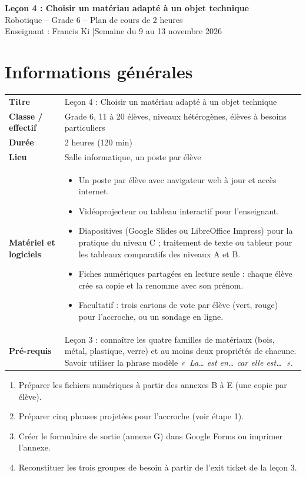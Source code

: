 \documentclass[11pt,a4paper]{article}
\begin{document}
\begin{tcolorbox}[colback=teal!10,colframe=teal!70!black,arc=2mm,boxrule=1pt]
\centering
{\LARGE\bfseries Leçon 4 : Choisir un matériau adapté à un objet technique}\\[2mm]
{\large Robotique -- Grade 6 -- Plan de cours de 2 heures}\\[1mm]
Enseignant : Francis Ki \quad|\quad Semaine du 9 au 13 novembre 2026
\end{tcolorbox}

\section{Informations générales}
\begin{tabularx}{\linewidth}{>{\bfseries}p{3.6cm}Y}
\toprule
Titre & Leçon 4 : Choisir un matériau adapté à un objet technique\\
Classe / effectif & Grade 6, 11 à 20 élèves, niveaux hétérogènes, élèves à besoins particuliers\\
Durée & 2 heures (120 min)\\
Lieu & Salle informatique, un poste par élève\\
Matériel et logiciels &
\begin{itemize}
 \item Un poste par élève avec navigateur web à jour et accès internet.
 \item Vidéoprojecteur ou tableau interactif pour l'enseignant.
 \item Diapositives (Google Slides ou LibreOffice Impress) pour la pratique du niveau C ; traitement de texte ou tableur pour les tableaux comparatifs des niveaux A et B.
 \item Fiches numériques partagées en lecture seule : chaque élève crée sa copie et la renomme avec son prénom.
 \item Facultatif : trois cartons de vote par élève (vert, rouge) pour l'accroche, ou un sondage en ligne.
\end{itemize}\\
Pré-requis &
Leçon 3 : connaître les quatre familles de matériaux (bois, métal, plastique, verre) et au moins deux propriétés de chacune. Savoir utiliser la phrase modèle \textit{«~La\ldots{} est en\ldots{} car elle est\ldots~»}.\\
\bottomrule
\end{tabularx}

\begin{astuce}
\begin{enumerate}
 \item Préparer les fichiers numériques à partir des annexes B à E (une copie par élève).
 \item Préparer cinq phrases projetées pour l'accroche (voir étape 1).
 \item Créer le formulaire de sortie (annexe G) dans Google Forms ou imprimer l'annexe.
 \item Reconstituer les trois groupes de besoin à partir de l'exit ticket de la leçon 3.
\end{enumerate}
\end{astuce}
\end{document}
